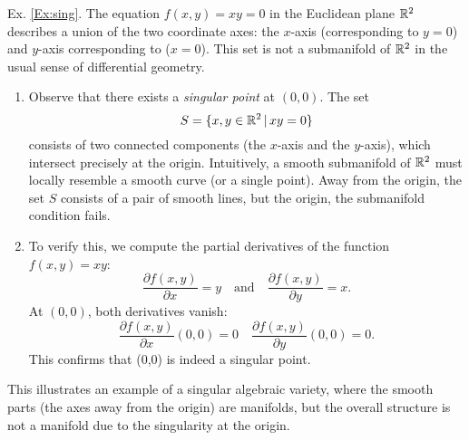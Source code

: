 Ex. \ref{Ex:sing}. The equation $f(x,y)=xy=0$ in the Euclidean plane $\mathbb{R}^2$ describes a union of the two coordinate axes:
the $x$-axis (corresponding to $y=0$) and $y$-axis corresponding to ($x=0$). This set is not a submanifold of $\mathbb{R}^2$ in the usual sense of differential geometry. 
\begin{enumerate}
    \item Observe that there exists a \emph{singular point} at $(0,0)$. The set 
    \[S=\{x,y\in \mathbb{R}^2\, |\, xy=0\}\] consists of two connected components (the $x$-axis and the $y$-axis), which intersect precisely at the origin. Intuitively, a smooth submanifold of $\mathbb{R}^2$ must locally resemble a smooth curve (or a single point). Away from the origin, the set $S$ consists of a pair of smooth lines, but the origin, the submanifold condition fails. 
    \item To verify this, we compute the partial derivatives of the function $f(x,y)=xy$:
    \[\frac{\partial f(x,y)}{\partial x}=y\quad \text{and} \quad \frac{\partial f(x,y)}{\partial y}=x.\]
    At $(0,0)$, both derivatives  vanish:
    \[\frac{\partial f(x,y)}{\partial x}(0,0)=0 \quad \frac{\partial f(x,y)}{\partial y}(0,0)=0.\]
    This confirms that (0,0) is indeed a singular point.  
\end{enumerate}
This illustrates an example of a singular algebraic variety, where the smooth parts (the axes away from the origin) are manifolds, but the overall structure is not a manifold due to the singularity at the origin.
